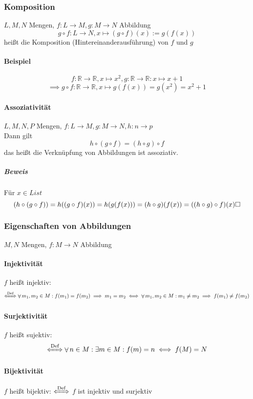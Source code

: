 \documentclass[a4paper]{scrartcl}
\DeclareMathOperator{\Forall}{\forall}
\theoremstyle{definition}
\theoremstyle{plain}
\theoremstyle{plain}
\theoremstyle{remark}
\theoremstyle{remark}
\theoremstyle{remark}
\theoremstyle{remark}
\theoremstyle{remark}
\begin{document}
\subsubsection{Komposition}
\label{sec-2-6-6}
$L,M,N$ Mengen, $f:L\to M,g:M\to N$ Abbildung \\
    \[g\circ f: L\to N, x\mapsto(g\circ f)(x):=g(f(x))\]
heißt die Komposition (Hintereinanderausführung) von $f$ und $g$
\paragraph{Beispiel}
\label{sec-2-6-6-1}
\[f:\mathbb{R}\to\mathbb{R},x\mapsto x^2, g:\mathbb{R}\to\mathbb{R}:x\mapsto x + 1\]
\[\implies g\circ f:\mathbb{R}\to\mathbb{R},x\mapsto g(f(x)) = g(x^2) = x^2 + 1\]
\paragraph{Assoziativität}
\label{sec-2-6-6-2}
$L,M,N,P$ Mengen, $f:L\to M, g:M\to N,h:n\to p$ \\
     Dann gilt
\[h\circ (g\circ f) = (h\circ g)\circ f\]
das heißt die Verknüpfung von Abbildungen ist assoziativ.
\subparagraph{Beweis}
\label{sec-2-6-6-2-1}
Für $x\in L ist$ \\
      \[(h\circ (g\circ f)) = h((g\circ f)(x)) = h(g(f(x))) = (h\circ g)(f(x)) = ((h\circ g)\circ f)(x)\hfill\square\]
\subsubsection{Eigenschaften von Abbildungen}
\label{sec-2-6-7}
$M,N$ Mengen, $f:M\to N$ Abbildung
\paragraph{Injektivität}
\label{sec-2-6-7-1}
$f$ heißt injektiv: \[\xLeftrightarrow{\text{Def}} \Forall m_1,m_2\in M: f(m_1) = f(m_2) \implies m_1 = m_2 \iff \Forall m_1,m_2\in M: m_1\neq m_2 \implies f(m_1)\neq f(m_2)\]
\paragraph{Surjektivität}
\label{sec-2-6-7-2}
$f$ heißt sujektiv:
\[\xLeftrightarrow{\text{Def}} \Forall n\in M :\exists m\in M: f(m) = n \iff f(M) = N\]
\paragraph{Bijektivität}
\label{sec-2-6-7-3}
$f$ heißt bijektiv: $\xLeftrightarrow{\text{Def}}$ $f$ ist injektiv und surjektiv
\end{document}
